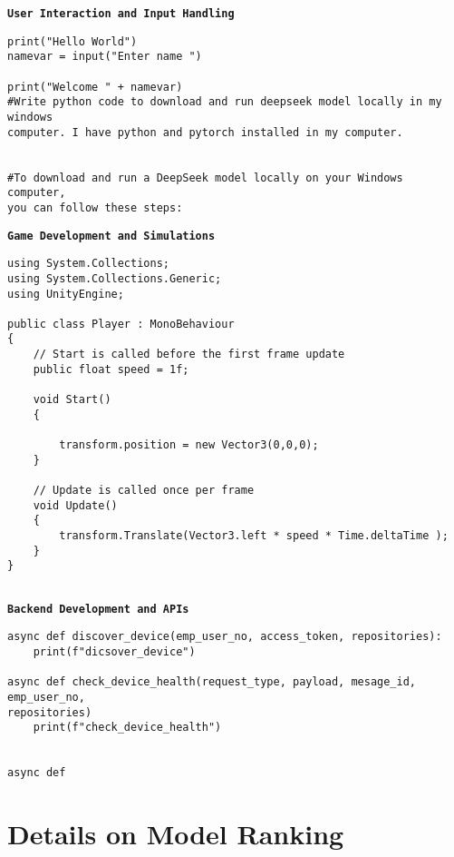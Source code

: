 \begin{tcolorbox}
\textbf{\texttt{User Interaction and Input Handling}}
\begin{verbatim}
print("Hello World")
namevar = input("Enter name ")

print("Welcome " + namevar)
#Write python code to download and run deepseek model locally in my windows 
computer. I have python and pytorch installed in my computer.


#To download and run a DeepSeek model locally on your Windows computer, 
you can follow these steps:

\end{verbatim}
\end{tcolorbox}

\begin{tcolorbox}
\textbf{\texttt{Game Development and Simulations}}
\begin{verbatim}
using System.Collections;
using System.Collections.Generic;
using UnityEngine;

public class Player : MonoBehaviour
{
    // Start is called before the first frame update
    public float speed = 1f;
    
    void Start()
    {
    
        transform.position = new Vector3(0,0,0);
    }

    // Update is called once per frame
    void Update()
    {
        transform.Translate(Vector3.left * speed * Time.deltaTime );             
    }
}


\end{verbatim}
\end{tcolorbox}


\begin{tcolorbox}
\textbf{\texttt{Backend Development and APIs}}
\begin{verbatim}
async def discover_device(emp_user_no, access_token, repositories):
    print(f"dicsover_device")

async def check_device_health(request_type, payload, mesage_id, emp_user_no, 
repositories)
    print(f"check_device_health")


async def

\end{verbatim}
\end{tcolorbox}

\section{Details on Model Ranking}\label{appendix:leaderboard}

